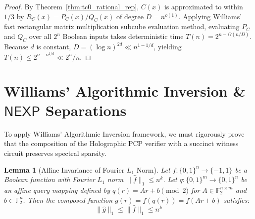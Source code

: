 \documentclass[11pt,a4paper]{article}
\newtheorem{lemma}[theorem]{Lemma}
\theoremstyle{definition}
\theoremstyle{remark}
\newcommand{\NEXP}{\mathsf{NEXP}}
\newcommand{\F}{\mathbb{F}}
\begin{document}
\begin{proof}
By Theorem~\ref{thm:tc0_rational_rep}, $C(x)$ is approximated to within $1/3$ by $R_C(x) = P_C(x) / Q_C(x)$ of degree $D = n^{o(1)}$. Applying Williams' fast rectangular matrix multiplication subcube evaluation method, evaluating $P_C$ and $Q_C$ over all $2^n$ Boolean inputs takes deterministic time $T(n) = 2^{n - \Omega(n/D)}$. Because $d$ is constant, $D = (\log n)^{2d} \ll n^{1 - 1/d}$, yielding $T(n) \le 2^{n - n^{1/d}} \ll 2^n / n$.
\end{proof}

\section{Williams' Algorithmic Inversion \& $\NEXP$ Separations}

To apply Williams' Algorithmic Inversion framework, we must rigorously prove that the composition of the Holographic PCP verifier with a succinct witness circuit preserves spectral sparsity.

\begin{lemma}[Affine Invariance of Fourier $L_1$ Norm]\label{lem:affine_l1_invariance}
Let $f : \{0,1\}^n \to \{-1, 1\}$ be a Boolean function with Fourier $L_1$ norm $\| \hat{f} \|_1 \le n^k$. Let $q : \{0,1\}^m \to \{0,1\}^n$ be an affine query mapping defined by $q(r) = A r + b \pmod 2$ for $A \in \F_2^{n \times m}$ and $b \in \F_2^n$. Then the composed function $g(r) = f(q(r)) = f(A r + b)$ satisfies:
\[
\| \hat{g} \|_1 \le \| \hat{f} \|_1 \le n^k
\]
\end{lemma}
\end{document}
